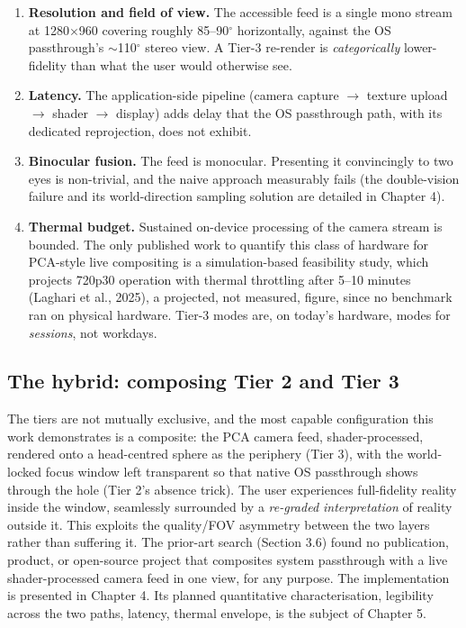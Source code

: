 \begin{enumerate}
\item \textbf{Resolution and field of view.} The accessible feed is a single mono stream at 1280$\times$960
covering roughly 85–90$^{\circ}$ horizontally, against the OS passthrough's $\sim$110$^{\circ}$ stereo view. A Tier-3
re-render is \textit{categorically} lower-fidelity than what the user would otherwise see.
\item \textbf{Latency.} The application-side pipeline (camera capture $\rightarrow$ texture upload $\rightarrow$ shader $\rightarrow$ display)
adds delay that the OS passthrough path, with its dedicated reprojection, does not exhibit.
\item \textbf{Binocular fusion.} The feed is monocular. Presenting it convincingly to two eyes is
non-trivial, and the naive approach measurably fails (the double-vision failure and its
world-direction sampling solution are detailed in Chapter 4).
\item \textbf{Thermal budget.} Sustained on-device processing of the camera stream is bounded. The only
published work to quantify this class of hardware for PCA-style live compositing is a
simulation-based feasibility study, which projects 720p30 operation with thermal throttling after
5–10 minutes (Laghari et al., 2025), a projected, not measured, figure, since no benchmark ran on
physical hardware. Tier-3 modes are, on today's hardware, modes for \textit{sessions}, not workdays.
\end{enumerate}

\subsection{The hybrid: composing Tier 2 and Tier 3}

The tiers are not mutually exclusive, and the most capable configuration this work demonstrates is a
composite: the PCA camera feed, shader-processed, rendered onto a head-centred sphere as the
periphery (Tier 3), with the world-locked focus window left transparent so that native OS passthrough
shows through the hole (Tier 2's absence trick). The user experiences full-fidelity reality inside
the window, seamlessly surrounded by a \textit{re-graded interpretation} of reality outside it. This
exploits the quality/FOV asymmetry between the two layers rather than suffering it. The prior-art
search (Section 3.6) found no publication, product, or open-source project that composites system
passthrough with a live shader-processed camera feed in one view, for any purpose. The implementation
is presented in Chapter 4. Its planned quantitative characterisation, legibility across the two
paths, latency, thermal envelope, is the subject of Chapter 5.

